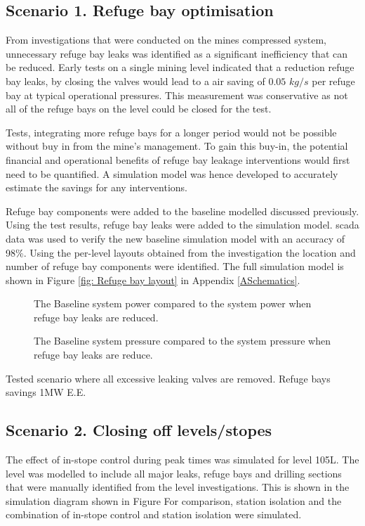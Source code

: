 	\subsection{Scenario 1. Refuge bay optimisation}
	From investigations that were conducted on the mines compressed system, unnecessary refuge bay leaks was identified as a significant inefficiency that can be reduced. Early tests on a single mining level indicated that a reduction refuge bay leaks, by closing the valves would lead to a air saving of $0.05$ $kg/s$ per refuge bay at typical operational pressures. This measurement was conservative as not all of the refuge bays on the level could be closed for the test.
	\par 
	Tests, integrating more refuge bays for a longer period would not be possible without buy in from the mine's management. To gain this buy-in, the potential financial and operational benefits of refuge bay leakage interventions would first need to be quantified. A simulation model was hence developed to accurately estimate the savings for any interventions.
	\par
	Refuge bay components were added to the baseline modelled discussed previously. Using the test results, refuge bay leaks were added to the simulation model. \gls{scada} data was used to verify the new baseline simulation model with an accuracy of 98\%. Using the per-level layouts obtained from the investigation the location and number of refuge bay components were identified. The full simulation model is shown in Figure \ref{fig: Refuge bay layout} in Appendix \ref{ASchematics}.
	\par 
	
	\begin{figure}[h]
		\centering
		\fbox{}
		\caption{The Baseline system power compared to the system power when refuge bay leaks are reduced.}
		\label{fig: RefugeBay Power.}
	\end{figure}   

	\begin{figure}[h]
		\centering
		\fbox{}
		\caption{The Baseline system pressure compared to the system pressure when refuge bay leaks are reduce.}
		\label{fig: RefugeBay Pressures.}
	\end{figure}  
	Tested scenario where all excessive leaking valves are removed.
	Refuge bays savings 1MW E.E.
	
	\subsection{Scenario 2. Closing off levels/stopes}
	The effect of in-stope control during peak times was simulated for level 105L. The level was modelled to include all major leaks, refuge bays and drilling sections that were manually identified from the level investigations. This is shown in the simulation diagram shown in Figure For comparison, station isolation and the combination of in-stope control and station isolation were simulated. 
	
